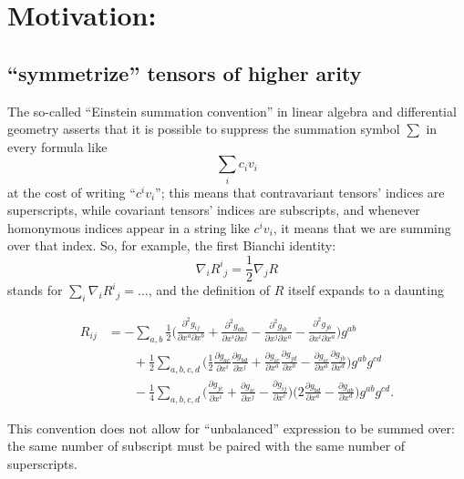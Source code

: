 \documentclass[11pt]{amsart}
\begin{document}
\maketitle
\tableofcontents
\section{Motivation:}
\label{sec:org59907ba}
\subsection{``symmetrize'' tensors of higher arity}
\label{sec:orgb9ea8dc}

The so-called ``Einstein summation convention'' in linear algebra and differential geometry 
asserts that it is possible to suppress the summation symbol \(\sum\) in every formula like 
\[
 \textstyle \sum_i c_i v_i
\] at the cost of writing ``\(c^iv_i\)''; this means that contravariant tensors' indices are superscripts,
while covariant tensors' indices are subscripts, and whenever homonymous indices appear in a string 
like \(c^iv_i\), it means that we are summing over that index. So, for example, the first
Bianchi identity:
\[
\nabla_i {R^i}_j = \frac{1}{2}\nabla_j R
\] stands for \(\sum_i \nabla_i {R^i}_j = \dots\), and the definition of \(R\) itself expands to a daunting

\begin{align*}
R_{ij}&=-\sum_{a,b}\frac{1}{2}\Big(\frac{\partial^2g_{ij}}{\partial x^a\partial x^b}+\frac{\partial^2g_{ab}}{\partial x^i\partial x^j}-\frac{\partial^2g_{ib}}{\partial x^j\partial x^a}-\frac{\partial^2g_{jb}}{\partial x^i\partial x^a}\Big)g^{ab}\\
&\qquad+\frac{1}{2}\sum_{a,b,c,d}\Big(\frac{1}{2}\frac{\partial g_{ac}}{\partial x^i}\frac{\partial g_{bd}}{\partial x^j}+\frac{\partial g_{ic}}{\partial x^a}\frac{\partial g_{jd}}{\partial x^b}-\frac{\partial g_{ic}}{\partial x^a}\frac{\partial g_{jb}}{\partial x^d}\Big)g^{ab}g^{cd}\\
&\qquad-\frac{1}{4}\sum_{a,b,c,d}\Big(\frac{\partial g_{jc}}{\partial x^i}+\frac{\partial g_{ic}}{\partial x^j}-\frac{\partial g_{ij}}{\partial x^c}\Big)\Big(2\frac{\partial g_{bd}}{\partial x^a}-\frac{\partial g_{ab}}{\partial x^d}\Big)g^{ab}g^{cd}.
\end{align*}  

This convention does not allow for ``unbalanced'' expression to be summed over: the
same number of subscript must be paired with the same number of superscripts.
\end{document}
